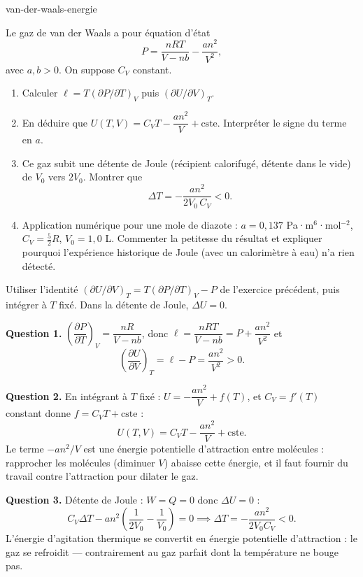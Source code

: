 \begin{exo}{van-der-waals-energie}

Le gaz de van der Waals a pour équation d'état
\[
P = \frac{nRT}{V - nb} - \frac{an^2}{V^2},
\]
avec $a, b > 0$. On suppose $C_V$ constant.

\begin{enumerate}
\item Calculer $\ell = T\left(\partial P/\partial T\right)_V$ puis $\left(\partial U/\partial V\right)_T$.
\item En déduire que $U(T,V) = C_VT - \dfrac{an^2}{V} + \text{cste}$. Interpréter le signe du terme en $a$.
\item Ce gaz subit une détente de Joule (récipient calorifugé, détente dans le vide) de $V_0$ vers $2V_0$. Montrer que
\[
\Delta T = -\frac{an^2}{2V_0\,C_V} < 0.
\]
\item Application numérique pour une mole de diazote : $a = 0{,}137$ Pa·m$^6$·mol$^{-2}$, $C_V = \frac{5}{2}R$, $V_0 = 1{,}0$ L. Commenter la petitesse du résultat et expliquer pourquoi l'expérience historique de Joule (avec un calorimètre à eau) n'a rien détecté.
\end{enumerate}

\begin{indication}
Utiliser l'identité $\left(\partial U/\partial V\right)_T = T\left(\partial P/\partial T\right)_V - P$ de l'exercice précédent, puis intégrer à $T$ fixé. Dans la détente de Joule, $\Delta U = 0$.
\end{indication}

\begin{solution}
\textbf{Question 1.} $\left(\dfrac{\partial P}{\partial T}\right)_V = \dfrac{nR}{V - nb}$, donc $\ell = \dfrac{nRT}{V - nb} = P + \dfrac{an^2}{V^2}$ et
\[
\left(\frac{\partial U}{\partial V}\right)_T = \ell - P = \frac{an^2}{V^2} > 0.
\]

\textbf{Question 2.} En intégrant à $T$ fixé : $U = -\dfrac{an^2}{V} + f(T)$, et $C_V = f'(T)$ constant donne $f = C_VT + \text{cste}$ :
\[
U(T,V) = C_VT - \frac{an^2}{V} + \text{cste}.
\]
Le terme $-an^2/V$ est une énergie potentielle d'attraction entre molécules : rapprocher les molécules (diminuer $V$) abaisse cette énergie, et il faut fournir du travail contre l'attraction pour dilater le gaz.

\textbf{Question 3.} Détente de Joule : $W = Q = 0$ donc $\Delta U = 0$ :
\[
C_V\Delta T - an^2\left(\frac{1}{2V_0} - \frac{1}{V_0}\right) = 0 \implies \Delta T = -\frac{an^2}{2V_0C_V} < 0.
\]
L'énergie d'agitation thermique se convertit en énergie potentielle d'attraction : le gaz se refroidit — contrairement au gaz parfait dont la température ne bouge pas.


\end{solution}
\end{exo}
